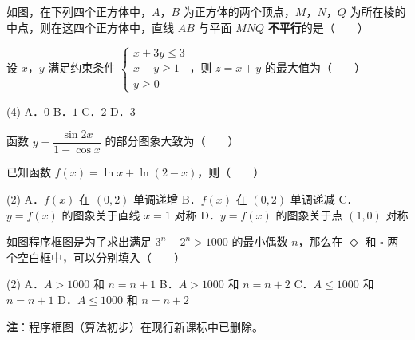 \begin{question}
如图，在下列四个正方体中，$A$，$B$ 为正方体的两个顶点，$M$，$N$，$Q$ 为所在棱的中点，则在这四个正方体中，直线 $AB$ 与平面 $MNQ$ \textbf{不平行}的是\mbox{（　　）}
\nopagebreak[4]
\begin{center}\end{center}
\nopagebreak[4]
\nopagebreak[4]
\begin{center}\end{center}
\nopagebreak[4]
\end{question}
\begin{question}
设 $x$，$y$ 满足约束条件 $\begin{cases}x+3y\le3\\ x-y\ge1\\ y\ge0\end{cases}$，则 $z=x+y$ 的最大值为\mbox{（　　）}

\begin{gkopts}(4)
\task A．$0$
\task B．$1$
\task C．$2$
\task D．$3$
\end{gkopts}

\Needspace{0.4\textheight}
\end{question}
\begin{question}
函数 $y=\dfrac{\sin2x}{1-\cos x}$ 的部分图象大致为\mbox{（　　）}
\nopagebreak[4]
\begin{center}\end{center}
\nopagebreak[4]
\end{question}
\begin{question}
已知函数 $f(x)=\ln x+\ln(2-x)$，则\mbox{（　　）}

\begin{gkopts}(2)
\task A．$f(x)$ 在 $(0,2)$ 单调递增
\task B．$f(x)$ 在 $(0,2)$ 单调递减
\task C．$y=f(x)$ 的图象关于直线 $x=1$ 对称
\task D．$y=f(x)$ 的图象关于点 $(1,0)$ 对称
\end{gkopts}

\Needspace{0.4\textheight}
\end{question}
\begin{question}
如图程序框图是为了求出满足 $3^{n}-2^{n}>1000$ 的最小偶数 $n$，那么在 $\Diamond$ 和 $\square$ 两个空白框中，可以分别填入\mbox{（　　）}
\nopagebreak[4]
\begin{center}\end{center}
\nopagebreak[4]
\begin{gkopts}(2)
\task A．$A>1000$ 和 $n=n+1$
\task B．$A>1000$ 和 $n=n+2$
\task C．$A\le1000$ 和 $n=n+1$
\task D．$A\le1000$ 和 $n=n+2$
\end{gkopts}

\begin{gktip}
\textbf{注}：程序框图（算法初步）在现行新课标中已删除。
\end{gktip}

\end{question}
